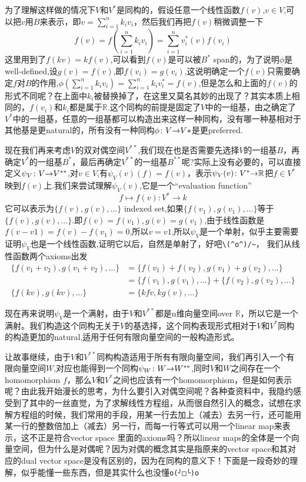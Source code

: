 \documentclass[UTF8,11pt,a4paper]{ctexart}%
\begin{document}
为了理解这样做的情况下$V$和$V^{*}$是同构的，假设任意一个线性函数$f(v)$,$v \in V$,可以把$v$用$B$来表示，即$v=\sum\limits_{i=1}^{n}{k_iv_i}$，然后我们再把$f(v)$稍微调整一下\[f(v)=f\left(\sum\limits_{i=1}^{n}{k_iv_i}\right)=\sum\limits_{i=1}^{n}{v_i^{*}(v)f(v_i)}\]这里用到了$f(kv)=kf(v)$,可以看到$f(v)$是可以被$B^*$ span的，为了说明$\phi$是well-defined,设$g(v)=f(v)$,即$f(v_i)=g(v_i)$,这说明确定一个$f(v)$只需要确定$f$对$B$的作用,$\phi(\sum\limits_{i=1}^{n}{k_iv_i})=\sum\limits_{i=1}^{n}{k_iv_i^{*}}=f(v)$,但是怎么和上面的$f(v)$的形式不同呢？在上面中$k_i$被替换掉了，在这里又莫名其妙的出现了？其实本质上相同的，$f(v_i)$和$k_i$都是属于$\mathbb{R}$.这个同构的前提是固定了$V$中的一组基，由之确定了$V^{*}$中的一组基，任意的一组基都可以构造出来这样一种同构，没有哪一种基相对于其他基是更natural的，所有没有一种同构${\phi}\colon{V}{\to}{V*}$是更preferred.

现在我们再来考虑$V$的双对偶空间$V^{**}$,我们现在也是否需要先选择$V$的一组基$B$，再确定$V^{*}$的一组基$B^{*}$，最后再确定$V^{**}$的一组基$B^{**}$呢?实际上没有必要的，可以直接定义${\psi_{V}}\colon{V}{\to}{V^{**}}$,对$v \in V$,有$\psi_{V}(v)(f)=f(v)$，表示${\psi_{V}(v)}\colon{V^*}{\to}{\mathbb{R}}$把$f \in V^{*}$映到$f(v)$上.我们来尝试理解$\psi_{V}(v)$,它是一个“evaluation function”\[f \mapsto f(v) \colon V^{*} \rightarrow k\]它可以表示为$\{f(v),g(v),\ldots\}$ indexed set,如果$\{f(v_1),g(v_1),\ldots\}$等于$\{f(v),g(v),\ldots\}$.即$f(v)=f(v_1),g(v)=g(v_1)$,由于线性函数是$f(v-v1)=f(v)-f(v_1)=0$,所以$v=v1$,所以$\psi_{V}$是一个单射，似乎主要需要证明$\psi_{V}$也是一个线性函数,证明它以后，自然是单射了，好吧\verb|\(^o^)/~|， 我们从线性函数两个axioms出发
	\begin{align*}
		\{f(v_1+v_2),g(v_1+v_2),\ldots\}& =\{f(v_1)+f(v_2),g(v_1)+g(v_2),\ldots\} \\ 
		&=\{f(v_1),g(v_1),\ldots\}+\{f(v_2),g(v_2),\ldots\}\\
		\{f(kv),g(kv),\ldots\} &= \{kf{v},kg(v),\ldots\}	
	\end{align*}

现在再来说明$\psi_{V}$是一个满射，由于$V$和$V^{**}$都是n维向量空间over $\mathbb{R}$，所以它是一个满射。我们构造这个同构无关于$V$的基选择，这个同构表现形式相对于$V$和$V^{*}$同构的构造更加的natural,适用于任何有限向量空间的一般构造形式。


让故事继续，由于$V$和$V^{**}$同构构造适用于所有有限向量空间，我们再引入一个有限向量空间$W$,对应也能得到一个同构${\psi_{W}}\colon{W}{\to}{W^{**}}$,同时$V$和$W$之间存在一个homomorphism $f$，那么$V$和$V^{*}$之间也应该有一个homomorphism，但是如何表示呢？由此我开始漫长的思考，为什么要引入对偶空间呢？各种查资料中，我隐约感受到了其中的一丝直觉，为了求解线性方程组，从而很自然引入的概念，试想在求解方程组的时候，我们常用的手段，用某一行去加上（减去）去另一行，还可能用某一行的整数倍加上（减去）另一行，而每一行等式可以用一个linear map来表示，这不正是符合vector space 里面的axioms吗？所以linear maps的全体是一个向量空间，但为什么是对偶呢？因为对偶的概念其实是指原来的vector space和其对应的dual vector space是没有区别的，因为在同构的意义下！下面是一段奇妙的理解，似乎能懂一些东西，但是其实什么也没懂\verb|o(╯□╰)o|
\end{document}
